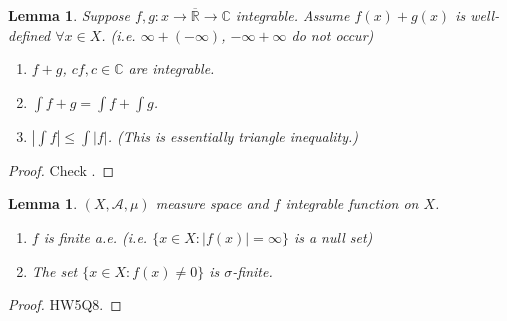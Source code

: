 \documentclass{report}
\newcommand{\R}{\mathbb{R}}
\newcommand{\C}{\mathbb{C}}
\newtheorem{lemma}[theorem]{Lemma}
\theoremstyle{definition}
\theoremstyle{remark}
\begin{document}
\begin{lemma}
	Suppose $f, g: x \to \overline{\R} \to \C$ integrable.
	Assume $f(x) + g(x)$ is well-defined $\forall x \in X$. (i.e. $\infty + (-\infty)$, $-\infty + \infty$ do not occur) \begin{enumerate}
		\item $f + g$, $cf, c \in \C$ are integrable.
		\item $\displaystyle \int f + g = \int f + \int g$.
		\item $\displaystyle \left|\int f\right| \leq \int |f|$. (This is essentially triangle inequality.)
	\end{enumerate}
\end{lemma}
\begin{proof}
	Check \cite[p.53]{follandRealAnalysisModern1999}.
\end{proof}
\begin{lemma}
	$(X, \mathcal{A}, \mu)$ measure space and $f$ \emph{integrable} function on $X$.
	\begin{enumerate}
		\item $f$ is finite a.e. (i.e. $\{x \in X: |f(x)| = \infty\}$ is a null set)
		\item The set $\{x \in X: f(x) \neq 0\}$ is $\sigma$-finite.
	\end{enumerate}
\end{lemma}
\begin{proof}
	HW5Q8.
\end{proof}
\end{document}
